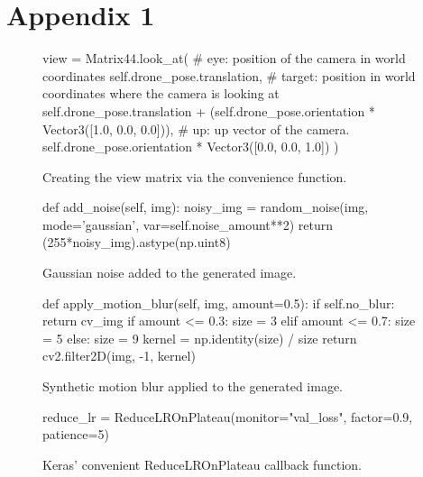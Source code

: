 \chapter{Appendix 1}

\begin{figure}[h - 5em]
	\center
	\begin{python}
		view = Matrix44.look_at(
			# eye: position of the camera in world coordinates
			self.drone_pose.translation,
			# target: position in world coordinates where the camera is looking at
			self.drone_pose.translation + (self.drone_pose.orientation *
										   Vector3([1.0, 0.0, 0.0])),
			# up: up vector of the camera.
			self.drone_pose.orientation * Vector3([0.0, 0.0, 1.0])
		)
	\end{python}
	\caption[The  function]{Creating the view matrix via the
	convenience  function.}
        \label{fig:lookup}
\end{figure}
\begin{figure}[h!]
    \centering
    \begin{python}
        def add_noise(self, img):
            noisy_img = random_noise(img, mode='gaussian',
                                     var=self.noise_amount**2)
            return (255*noisy_img).astype(np.uint8)
    \end{python}
    \caption{Gaussian noise added to the generated image.}
    \label{fig:addnoise}
\end{figure}
\begin{figure}[h!]
    \centering
    \begin{python}
        def apply_motion_blur(self, img, amount=0.5):
            if self.no_blur: return cv_img
            if amount <= 0.3:
                size = 3
            elif amount <= 0.7:
                size = 5
            else:
                size = 9
            kernel = np.identity(size) / size
            return cv2.filter2D(img, -1, kernel)
    \end{python}
    \caption{Synthetic motion blur applied to the generated image.}
    \label{fig:motionblur}
\end{figure}
\begin{figure}[h!]
    \centering
    \begin{python}
reduce_lr = ReduceLROnPlateau(monitor="val_loss", factor=0.9, patience=5)
    \end{python}
    \caption{Keras' convenient ReduceLROnPlateau callback function.}
    \label{fig:reducelronplateau}
\end{figure}
